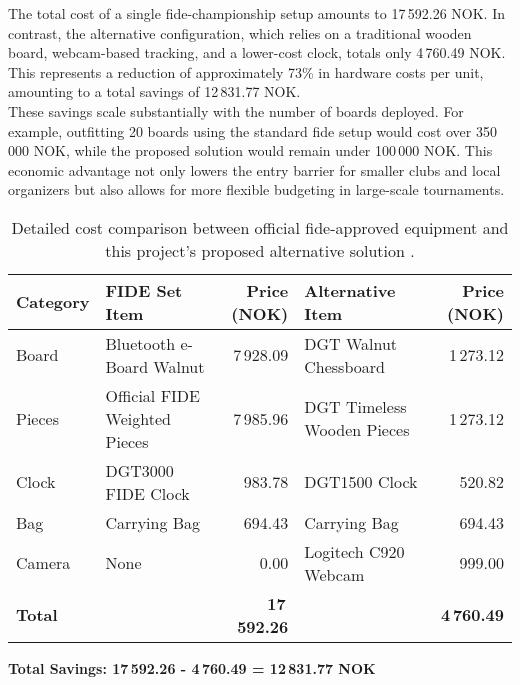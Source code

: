 \newpage

The total cost of a single \gls{fide}-championship setup amounts to 17\,592.26 NOK. In contrast, the alternative configuration, which relies on a traditional wooden board, webcam-based tracking, and a lower-cost clock, totals only 4\,760.49 NOK. This represents a reduction of approximately 73\% in hardware costs per unit, amounting to a total savings of 12\,831.77 NOK. \\

These savings scale substantially with the number of boards deployed. For example, outfitting 20 boards using the standard \gls{fide} setup would cost over 350\,000 NOK, while the proposed solution would remain under 100\,000 NOK. This economic advantage not only lowers the entry barrier for smaller clubs and local organizers but also allows for more flexible budgeting in large-scale tournaments. \\

\begin{table}[h!]
\centering
\caption[Detailed cost comparison]{Detailed cost comparison between official \gls{fide}-approved equipment and this project's proposed alternative solution \cite{dgtshop:prices}.}
\label{tab:detailed-price-comparison}
\begin{tabular}{lL{4cm}rL{4cm}r}
\toprule
\textbf{Category} & \textbf{FIDE Set Item} & \textbf{Price (NOK)} & \textbf{Alternative Item} & \textbf{Price (NOK)} \\
\midrule
Board & Bluetooth e-Board Walnut & 7\,928.09 & DGT Walnut Chessboard & 1\,273.12 \\
Pieces & Official FIDE Weighted Pieces & 7\,985.96 & DGT Timeless Wooden Pieces & 1\,273.12 \\
Clock & DGT3000 FIDE Clock & 983.78 & DGT1500 Clock & 520.82 \\
Bag & Carrying Bag & 694.43 & Carrying Bag & 694.43 \\
Camera & None & 0.00 & Logitech C920 Webcam & 999.00 \\
\midrule
\textbf{Total} & & \textbf{17\,592.26} & & \textbf{4\,760.49} \\
\bottomrule
\end{tabular}
\vspace{0.3cm}

\textbf{Total Savings: 17\,592.26 - 4\,760.49 = 12\,831.77 NOK}
\end{table}

